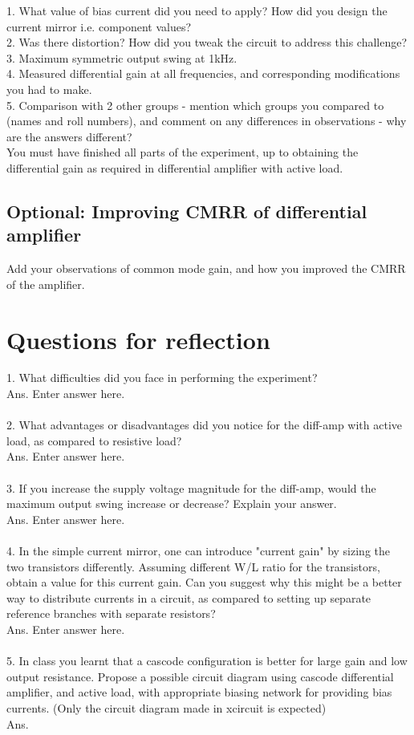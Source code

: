 \documentclass[12pt]{article}
\begin{document}
1. What value of bias current did you need to apply? How did you design the current mirror i.e. component values?\\
2. Was there distortion? How did you tweak the circuit to address this challenge?\\
3. Maximum symmetric output swing at 1kHz.\\
4. Measured differential gain at all frequencies, and corresponding modifications you had to make.\\
5. Comparison with 2 other groups - mention which groups you compared to (names and roll numbers), and comment on any differences in observations - why are the answers different?\\

You must have finished all parts of the experiment, up to obtaining the differential gain as required in differential amplifier with active load.

\subsection{Optional: Improving CMRR of differential amplifier}

Add your observations of common mode gain, and how you improved the CMRR of the amplifier.

\section{Questions for reflection}

1. What difficulties did you face in performing the experiment?\\
Ans. Enter answer here.
\\\\
2. What advantages or disadvantages did you notice for the diff-amp with active load, as compared to resistive load?\\
Ans. Enter answer here.
\\\\
3. If you increase the supply voltage magnitude for the diff-amp, would the maximum output swing increase or decrease? Explain your answer.\\
Ans. Enter answer here.
\\\\
4. In the simple current mirror, one can introduce "current gain" by sizing the two transistors differently. Assuming different W/L ratio for the transistors, obtain a value for this current gain. Can you suggest why this might be a better way to distribute currents in a circuit, as compared to setting up separate reference branches with separate resistors?\\
Ans. Enter answer here.
\\\\
5. In class you learnt that a cascode configuration is better for large gain and low output resistance. Propose a possible circuit diagram using cascode differential amplifier, and active load, with appropriate biasing network for providing bias currents. (Only the circuit diagram made in xcircuit is expected)\\
Ans.
\end{document}
